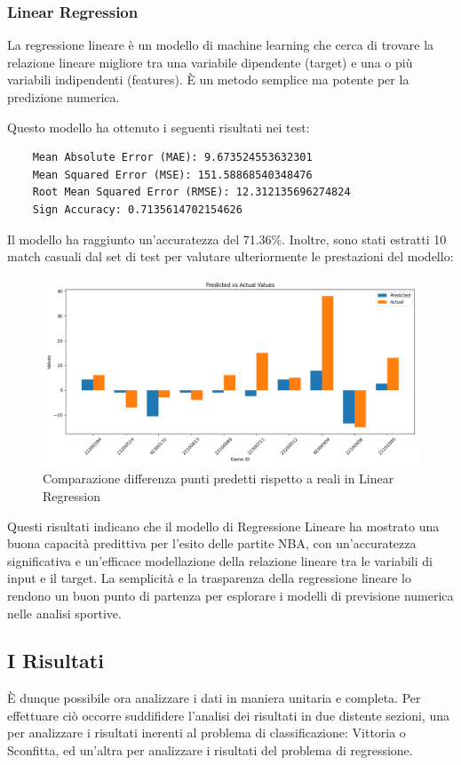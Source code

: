 \documentclass[a4paper]{article}
\numberwithin{equation}{section}
\begin{document}
\subsubsection{Linear Regression}

La regressione lineare è un modello di machine learning che cerca di trovare la relazione lineare migliore tra una variabile dipendente (target) e una o più variabili indipendenti (features). È un metodo semplice ma potente per la predizione numerica.

Questo modello ha ottenuto i seguenti risultati nei test:

\begin{lstlisting}
    Mean Absolute Error (MAE): 9.673524553632301
    Mean Squared Error (MSE): 151.58868540348476
    Root Mean Squared Error (RMSE): 12.312135696274824
    Sign Accuracy: 0.7135614702154626
\end{lstlisting}

Il modello ha raggiunto un'accuratezza del 71.36\%. Inoltre, sono stati estratti 10 match casuali dal set di test per valutare ulteriormente le prestazioni del modello:

\begin{figure}[H]
    \centering
    \includegraphics[width=0.7\linewidth]{img/linear_regression_istogramma.png}
    \caption{Comparazione differenza punti predetti rispetto a reali in Linear Regression}
    \label{fig:enter-label}
\end{figure}

Questi risultati indicano che il modello di Regressione Lineare ha mostrato una buona capacità predittiva per l'esito delle partite NBA, con un'accuratezza significativa e un'efficace modellazione della relazione lineare tra le variabili di input e il target. La semplicità e la trasparenza della regressione lineare lo rendono un buon punto di partenza per esplorare i modelli di previsione numerica nelle analisi sportive.


\subsection{I Risultati}
È dunque possibile ora analizzare i dati in maniera unitaria e completa. Per effettuare ciò occorre suddifidere l'analisi dei risultati in due distente sezioni, una per analizzare i risultati inerenti al problema di classificazione: Vittoria o Sconfitta, ed un'altra per analizzare i risultati del problema di regressione.
\end{document}

